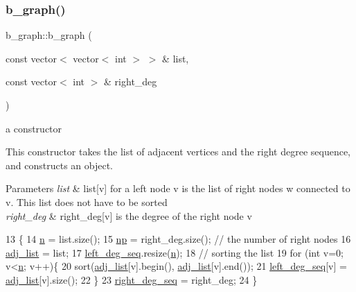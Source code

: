 \subsubsection{\texorpdfstring{b\+\_\+graph()}{b\_graph()}\hspace{0.1cm}{\footnotesize\ttfamily [3/4]}}
{\footnotesize\ttfamily b\+\_\+graph\+::b\+\_\+graph (\begin{DoxyParamCaption}\item[{const vector$<$ vector$<$ int $>$ $>$ \&}]{list,  }\item[{const vector$<$ int $>$ \&}]{right\+\_\+deg }\end{DoxyParamCaption})}



a constructor 

This constructor takes the list of adjacent vertices and the right degree sequence, and constructs an object. 
\begin{DoxyParams}{Parameters}
{\em list} & list\mbox{[}v\mbox{]} for a left node v is the list of right nodes w connected to v. This list does not have to be sorted \\
\hline
{\em right\+\_\+deg} & right\+\_\+deg\mbox{[}v\mbox{]} is the degree of the right node v \\
\hline
\end{DoxyParams}

\begin{DoxyCode}
13 \{
14   \hyperlink{classb__graph_a9e211d40c1799bc9b125de472ff06642}{n} = list.size();
15   \hyperlink{classb__graph_acffdd5f20329515eb6ec17ad24f1ca64}{np} = right\_deg.size(); \textcolor{comment}{// the number of right nodes}
16   \hyperlink{classb__graph_a2a89d2e8f958270952aab2e8769b7342}{adj\_list} = list;
17   \hyperlink{classb__graph_a311d16462dbb10c47b3a6c80a42139d9}{left\_deg\_seq}.resize(\hyperlink{classb__graph_a9e211d40c1799bc9b125de472ff06642}{n});
18   \textcolor{comment}{// sorting the list}
19   \textcolor{keywordflow}{for} (\textcolor{keywordtype}{int} v=0; v<\hyperlink{classb__graph_a9e211d40c1799bc9b125de472ff06642}{n}; v++)\{
20     sort(\hyperlink{classb__graph_a2a89d2e8f958270952aab2e8769b7342}{adj\_list}[v].begin(), \hyperlink{classb__graph_a2a89d2e8f958270952aab2e8769b7342}{adj\_list}[v].end());
21     \hyperlink{classb__graph_a311d16462dbb10c47b3a6c80a42139d9}{left\_deg\_seq}[v] = \hyperlink{classb__graph_a2a89d2e8f958270952aab2e8769b7342}{adj\_list}[v].size();
22   \}
23   \hyperlink{classb__graph_ae4c875ed6a583a78f38dfe958f20fad5}{right\_deg\_seq} = right\_deg;
24 \}
\end{DoxyCode}
\mbox{\label{classb__graph_a070770b36a9d003289813dde31238263}} 
